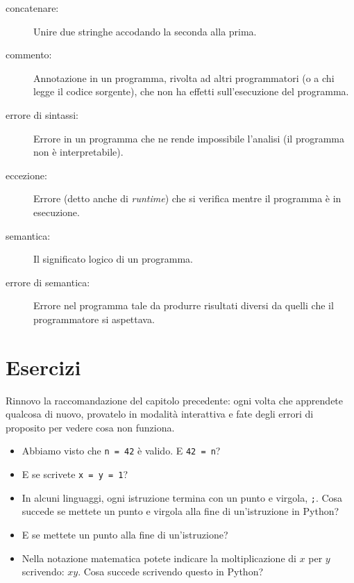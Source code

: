 \documentclass[10pt]{book}
\begin{document}
\begin{description}
\item[concatenare:]  Unire due stringhe accodando la seconda alla prima.

\item[commento:]  Annotazione in un programma, rivolta ad altri programmatori (o a chi legge il codice sorgente), che non ha effetti sull'esecuzione del programma.

\item[errore di sintassi:]  Errore in un programma che ne rende impossibile l'analisi (il programma non è interpretabile).

\item[eccezione:]  Errore (detto anche di {\em runtime}) che si verifica mentre il programma è in esecuzione.

\item[semantica:]  Il significato logico di un programma.

\item[errore di semantica:]   Errore nel programma tale da produrre risultati diversi da quelli che il programmatore si aspettava.

\end{description}


\section{Esercizi}

\begin{exercise}

Rinnovo la raccomandazione del capitolo precedente: ogni volta che apprendete qualcosa di nuovo, provatelo in modalità interattiva e fate degli errori di proposito per vedere cosa non funziona.

\begin{itemize}

\item Abbiamo visto che {\tt n = 42} è valido. E {\tt 42 = n}?

\item E se scrivete {\tt x = y = 1}?

\item In alcuni linguaggi, ogni istruzione termina con un punto e virgola, {\tt ;}.
Cosa succede se mettete un punto e virgola alla fine di un'istruzione in Python?

\item E se mettete un punto alla fine di un'istruzione?

\item Nella notazione matematica potete indicare la moltiplicazione di $x$ per $y$ scrivendo: $x y$. 
Cosa succede scrivendo questo in Python?

\end{itemize}

\end{exercise}
\end{document}
